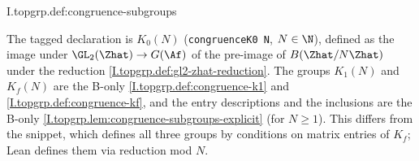 \begin{definition}
\end{definition}
\begin{tfformal}{I.topgrp.def:congruence-subgroups}
\begin{tffidelity}
The tagged declaration is $K_0(N)$ (\texttt{congruenceK0 N}, $N\in\N$), defined as the image under $\GL_2(\Zhat)\to G(\Af)$ of the pre-image of $B(\Zhat/N\Zhat)$ under the reduction \cref{I.topgrp.def:gl2-zhat-reduction}. The groups $K_1(N)$ and $K_f(N)$ are the B-only \cref{I.topgrp.def:congruence-k1} and \cref{I.topgrp.def:congruence-kf}, and the entry descriptions and the inclusions are the B-only \cref{I.topgrp.lem:congruence-subgroups-explicit} (for $N\ge1$). This differs from the snippet, which defines all three groups by conditions on matrix entries of $K_f$; Lean defines them via reduction mod $N$.
\end{tffidelity}
\end{tfformal}


